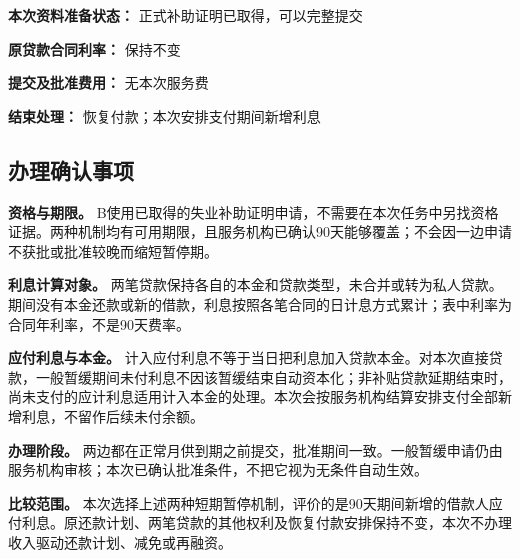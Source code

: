 \documentclass[UTF8,fontset=none,11pt,a4paper]{ctexart}
\begin{document}
\textbf{本次资料准备状态：} 正式补助证明已取得，可以完整提交


\textbf{原贷款合同利率：} 保持不变


\textbf{提交及批准费用：} 无本次服务费


\textbf{结束处理：} 恢复付款；本次安排支付期间新增利息


\subsection*{办理确认事项}
\textbf{资格与期限。} B使用已取得的失业补助证明申请，不需要在本次任务中另找资格证据。两种机制均有可用期限，且服务机构已确认90天能够覆盖；不会因一边申请不获批或批准较晚而缩短暂停期。


\textbf{利息计算对象。} 两笔贷款保持各自的本金和贷款类型，未合并或转为私人贷款。期间没有本金还款或新的借款，利息按照各笔合同的日计息方式累计；表中利率为合同年利率，不是90天费率。


\textbf{应付利息与本金。} 计入应付利息不等于当日把利息加入贷款本金。对本次直接贷款，一般暂缓期间未付利息不因该暂缓结束自动资本化；非补贴贷款延期结束时，尚未支付的应计利息适用计入本金的处理。本次会按服务机构结算安排支付全部新增利息，不留作后续未付余额。


\textbf{办理阶段。} 两边都在正常月供到期之前提交，批准期间一致。一般暂缓申请仍由服务机构审核；本次已确认批准条件，不把它视为无条件自动生效。


\textbf{比较范围。} 本次选择上述两种短期暂停机制，评价的是90天期间新增的借款人应付利息。原还款计划、两笔贷款的其他权利及恢复付款安排保持不变，本次不办理收入驱动还款计划、减免或再融资。
\end{document}
